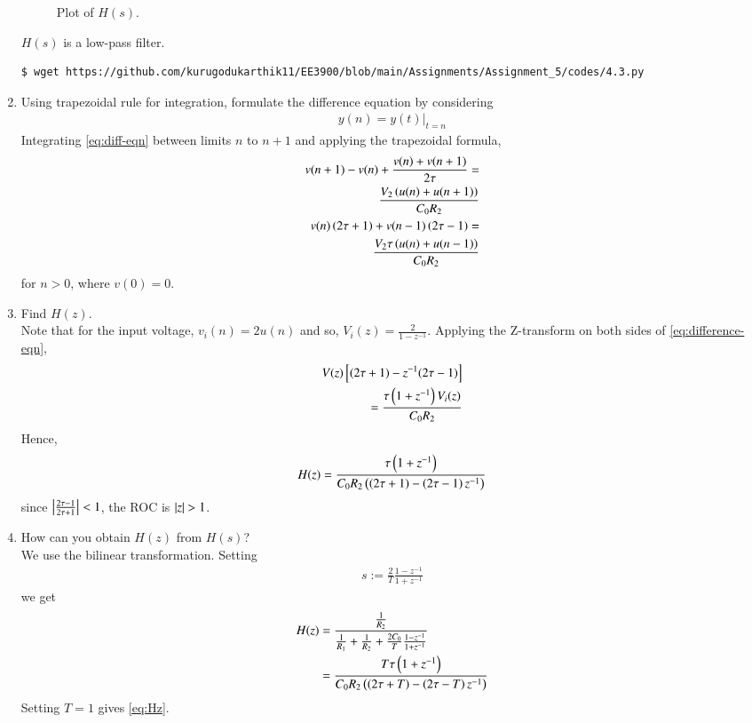 \documentclass[journal,12pt,twocolumn]{IEEEtran}
\renewcommand\thesection{\arabic{section}}
\begin{document}
\begin{enumerate}[label=\arabic*.,ref=\thesection.\theenumi]
\begin{figure}[!ht]
\caption{Plot of $H(s)$.}
\label{fig:Hs}
\end{figure}
$H(s)$ is a low-pass filter.
\begin{lstlisting}
$ wget https://github.com/kurugodukarthik11/EE3900/blob/main/Assignments/Assignment_5/codes/4.3.py
\end{lstlisting}
\item Using trapezoidal rule for integration, formulate the difference equation
by considering
\begin{align}
y(n) = y(t)\vert_{t=n}
\end{align}
\solution
Integrating \eqref{eq:diff-eqn} between limits $n$ to $n+1$
and applying the trapezoidal formula,
\begin{align}
v(n+1) - v(n) + \frac{v(n) + v(n+1)}{2\tau} = \nonumber\\
\frac{V_2\left(u(n)+u(n+1)\right)}{C_0R_2} \\
v(n)\left(2\tau+1\right) + v(n-1)\left(2\tau-1\right) = \nonumber\\
\frac{V_2\tau\left(u(n)+u(n-1)\right)}{C_0R_2}
\label{eq:difference-eqn}
\end{align}
for $n > 0$, where $v(0) = 0$.
\item Find $H(z)$. \\
\solution Note that for the input voltage, $v_i(n) = 2u(n)$ and
so, $V_i(z) = \frac{2}{1-z^{-1}}$. Applying the Z-transform
on both sides of \eqref{eq:difference-eqn},
\begin{align}
V(z){}\left[(2\tau + 1) - z^{-1}(2\tau - 1)\right] \nonumber \\
= \frac{\tau\left(1 + z^{-1}\right)V_i(z)}{C_0R_2}
\end{align}
Hence,
\begin{align}
H(z) = \frac{\tau\left(1+z^{-1}\right)}{C_0R_2\left(\left(2\tau+1\right)-\left(2\tau-1\right)z^{-1}\right)}
\label{eq:Hz}
\end{align}
since $\left\vert\frac{2\tau-1}{2\tau+1}\right\vert < 1$, the ROC is $\left\vert z\right\vert > 1$.
\\
\item How can you obtain $H(z)$ from $H(s)$? \\
\solution We use the bilinear transformation. Setting
\begin{align}
s := \frac{2}{T}\frac{1 - z^{-1}}{1 + z^{-1}}
\end{align}
we get
\begin{align}
H(z) &= \frac{\frac{1}{R_2}}{\frac{1}{R_1} + \frac{1}{R_2} + \frac{2C_0}{T}\frac{1 - z^{-1}}{1 + z^{-1}}} \\
&= \frac{T\tau\left(1+z^{-1}\right)}{C_0R_2\left(\left(2\tau+T\right)-\left(2\tau-T\right)z^{-1}\right)}
\end{align}
Setting $T = 1$ gives \eqref{eq:Hz}.
\end{enumerate}
\end{document}
